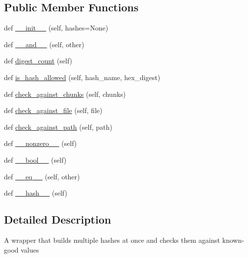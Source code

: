 \subsection*{Public Member Functions}
\begin{DoxyCompactItemize}
\item 
def \hyperlink{classpip_1_1__internal_1_1utils_1_1hashes_1_1Hashes_af305f259991d1fff05b663d160342204}{\+\_\+\+\_\+init\+\_\+\+\_\+} (self, hashes=None)
\item 
def \hyperlink{classpip_1_1__internal_1_1utils_1_1hashes_1_1Hashes_aba0114b6452f815c322f2beb8b78e27c}{\+\_\+\+\_\+and\+\_\+\+\_\+} (self, other)
\item 
def \hyperlink{classpip_1_1__internal_1_1utils_1_1hashes_1_1Hashes_a5366d1858938d41b9cb775beda6150c7}{digest\+\_\+count} (self)
\item 
def \hyperlink{classpip_1_1__internal_1_1utils_1_1hashes_1_1Hashes_ab91477c7b3bc8018e23f7b489f8ac088}{is\+\_\+hash\+\_\+allowed} (self, hash\+\_\+name, hex\+\_\+digest)
\item 
def \hyperlink{classpip_1_1__internal_1_1utils_1_1hashes_1_1Hashes_af5e572128be340438b101192e3543de0}{check\+\_\+against\+\_\+chunks} (self, chunks)
\item 
def \hyperlink{classpip_1_1__internal_1_1utils_1_1hashes_1_1Hashes_aab5e39baacd108071283d35849e7ebce}{check\+\_\+against\+\_\+file} (self, file)
\item 
def \hyperlink{classpip_1_1__internal_1_1utils_1_1hashes_1_1Hashes_a23eb8e6e6cf9b1de1d2ddd3651d0d0e3}{check\+\_\+against\+\_\+path} (self, path)
\item 
def \hyperlink{classpip_1_1__internal_1_1utils_1_1hashes_1_1Hashes_afe417b4dd2273a4f17d6e64768b1db13}{\+\_\+\+\_\+nonzero\+\_\+\+\_\+} (self)
\item 
def \hyperlink{classpip_1_1__internal_1_1utils_1_1hashes_1_1Hashes_a11a9149e938dab50aed56b03be770962}{\+\_\+\+\_\+bool\+\_\+\+\_\+} (self)
\item 
def \hyperlink{classpip_1_1__internal_1_1utils_1_1hashes_1_1Hashes_aa28f88dcdcc60e46855321ee331b9017}{\+\_\+\+\_\+eq\+\_\+\+\_\+} (self, other)
\item 
def \hyperlink{classpip_1_1__internal_1_1utils_1_1hashes_1_1Hashes_a700a6b13dd1f3a2b2d72d342e6ee38ca}{\+\_\+\+\_\+hash\+\_\+\+\_\+} (self)
\end{DoxyCompactItemize}


\subsection{Detailed Description}
\begin{DoxyVerb}A wrapper that builds multiple hashes at once and checks them against
known-good values\end{DoxyVerb}
 

